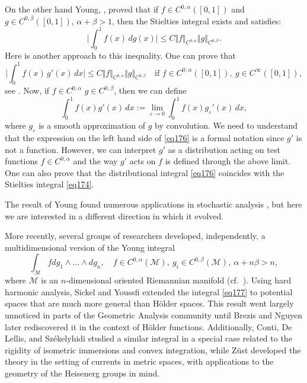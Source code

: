 \documentclass[intlimits,12pt,reqno]{amsart}
\newcommand{\cM}{\mathcal M}
\newcommand{\eps}{\varepsilon}
\numberwithin{equation}{section}
\theoremstyle{definition}
\begin{document}
On the other hand Young, \cite{Young}, proved that if $f\in C^{0,\alpha}([0,1])$ and $g\in C^{0,\beta}([0,1])$, $\alpha+\beta>1$, then the Stielties integral exists and satisfies:
\begin{equation}
\label{eq174}
\Bigg|\int_0^1 f(x)\, dg(x)\Bigg|\leq C\Vert f\Vert_{C^{0,\alpha}}\Vert g\Vert_{C^{0,\beta}}.
\end{equation}
Here is another approach to this inequality. One can prove that
$$
\Bigg|\int_0^1 f(x)\, g'(x)\, dx\Bigg|\leq C\Vert f\Vert_{C^{0,\alpha}}\Vert g\Vert_{C^{0,\beta}} 
\quad
\text{if } f\in C^{0,\alpha}([0,1]),\ g\in C^\infty([0,1]),
$$
see . Now, if $f\in C^{0,\alpha}$ $g\in C^{0,\beta}$, then we can define
\begin{equation}
\label{eq176}
\int_0^1 f(x) g'(x)\, dx:=\lim_{\eps\to 0} \int_0^1 f(x) g_\eps'(x)\, dx,
\end{equation}
where $g_\eps$ is a smooth approximation of $g$ by convolution.  
We need to understand that the expression on the left hand side of \eqref{eq176} is a formal notation since $g'$ is not a function. However, we can interpret $g'$ as a distribution acting on test functions $f\in C^{0,\alpha}$ and the way $g'$ acts on $f$ is defined through the above limit. One can also prove that the distributional integral \eqref{eq176} coincides with the Stielties integral \eqref{eq174}.

The result of Young found numerous applications in stochastic analysis \cite{FH}, but here we are interested in a different direction in which it evolved. 

More recently,
several groups of researchers developed, independently,
a multidimensional version of the Young integral
\begin{equation}
\label{eq177}
\int_\cM f dg_1\wedge\ldots\wedge dg_n, 
\quad 
f\in C^{0,\alpha}(\cM),\ g_i\in C^{0,\beta}(\cM),\ \alpha+n\beta>n,
\end{equation}
where $\cM$ is an $n$-dimensional oriented Riemannian manifold (cf.\ ). 
Using hard harmonic analysis, Sickel and Youssfi \cite{SY1999} extended the integral \eqref{eq177} to potential spaces that are much more general than H\"older spaces. This result went largely unnoticed in parts of the Geometric Analysis community until Brezis and Nguyen \cite{brezisn1,brezisn2} later rediscovered it in the context of H\"older functions. Additionally, Conti, De Lellis, and Sz\'ekelyhidi \cite{Conti} studied a similar integral in a special case related to the rigidity of isometric immersions and convex integration, while Z\"ust \cite{zust2,zust1} developed the theory in the setting of currents in metric spaces, with applications to the geometry of the Heisenerg groups in mind.
\end{document}
